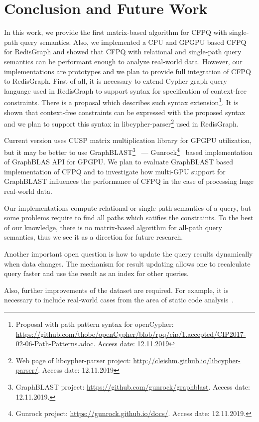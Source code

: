 \section{Conclusion and Future Work}
In this work, we provide the first matrix-based algorithm for CFPQ with single-path query semantics.
Also, we implemented a CPU and GPGPU based CFPQ for RedisGraph and showed that CFPQ with relational and single-path query semantics can be performant enough to analyze real-world data.
However, our implementations are prototypes and we plan to provide full integration of CFPQ to RedisGraph.
First of all, it is necessary to extend Cypher graph query language used in RedisGraph to support syntax for specification of context-free constraints.
There is a proposal which describes such syntax extension\footnote{Proposal with path pattern syntax for openCypher: \url{https://github.com/thobe/openCypher/blob/rpq/cip/1.accepted/CIP2017-02-06-Path-Patterns.adoc}. Access date: 12.11.2019}. It is shown that context-free constraints can be expressed with the proposed syntax and we plan to support this syntax in libcypher-parser\footnote{Web page of libcypher-parser project: \url{http://cleishm.github.io/libcypher-parser/}. Access date: 12.11.2019} used in RedisGraph.

Current version uses CUSP matrix multiplication library for GPGPU utilization, but it may be better to use GraphBLAST\footnote{GraphBLAST project: \url{https://github.com/gunrock/graphblast}. Access date: 12.11.2019.}~\cite{yang2019graphblast} --- Gunrock\footnote{Gunrock project: \url{https://gunrock.github.io/docs/}. Access date: 12.11.2019.}~\cite{Wang:2017:GGG:3131890.3108140} based implementation of GraphBLAS API for GPGPU.
We plan to evaluate GraphBLAST based implementation of CFPQ and to investigate how multi-GPU support for GraphBLAST influences the performance of CFPQ in the case of processing huge real-world data.

Our implementations compute relational or single-path semantics of a query, but some problems require to find all paths which satifies the constraints.
To the best of our knowledge, there is no matrix-based algorithm for all-path query semantics, thus we see it as a direction for future research.

Another important open question is how to update the query results dynamically when data changes.
The mechanism for result updating allows one to recalculate query faster and use the result as an index for other queries.

Also, further improvements of the dataset are required.
For example, it is necessary to include real-world cases from the area of static code analysis~\cite{Zheng:2008:DAA:1328897.1328464,veduradabatch,LPAR-21:Cauliflower_Solver_Generator_for}.
